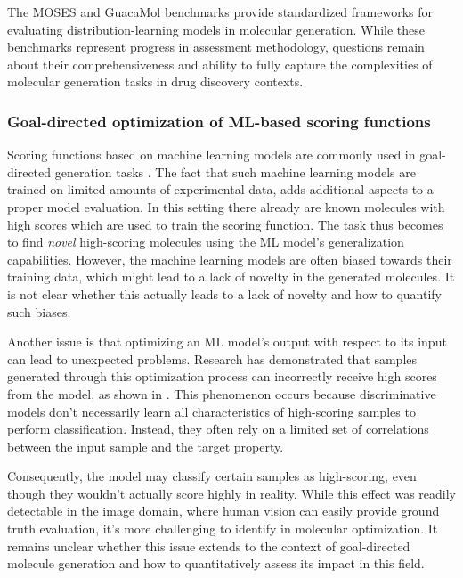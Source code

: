 The MOSES \citep{polykovskiyMolecularSetsMOSES2020} and GuacaMol
\citep{brownGuacaMolBenchmarkingModels2019} benchmarks provide standardized frameworks for
evaluating distribution-learning models in molecular generation. While these benchmarks represent
progress in assessment methodology, questions remain about their comprehensiveness and ability to
fully capture the complexities of molecular generation tasks in drug discovery contexts.

\subsubsection{Goal-directed optimization of ML-based scoring functions}
Scoring functions based on machine learning models are commonly used in goal-directed generation
tasks \citep{todo}. The fact that such machine learning models are trained on limited amounts of
experimental data, adds additional aspects to a proper model evaluation. In this setting there
already are known molecules with high scores which are  used to train the scoring function. The task
thus becomes to find \emph{novel} high-scoring molecules using the ML model's generalization
capabilities. However, the machine learning models are often biased towards their training data,
which might lead to a lack of novelty in the generated molecules. It is not clear whether
this actually leads to a lack of novelty and how to quantify such biases.

Another issue is that optimizing an ML model's output with respect to its input can lead to
unexpected problems. Research has demonstrated that samples generated through this optimization
process can incorrectly receive high scores from the model, as shown in
\citep{szegedyIntriguingPropertiesNeural2014,goodfellowExplainingHarnessingAdversarial2015}. This
phenomenon occurs because discriminative models don't necessarily learn all characteristics of
high-scoring samples to perform classification. Instead, they often rely on a limited set of
correlations between the input sample and the target property.

Consequently, the model may classify
certain samples as high-scoring, even though they wouldn't actually score highly in reality. While
this effect was readily detectable in the image domain, where human vision can easily provide ground
truth evaluation, it's more challenging to identify in molecular optimization. It remains unclear
whether this issue extends to the context of goal-directed molecule generation and how to
quantitatively assess its impact in this field.

